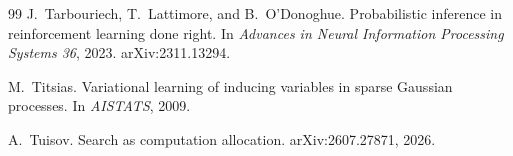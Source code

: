 \documentclass[11pt]{article}
\begin{document}
\begin{thebibliography}{99}
 J.~Tarbouriech, T.~Lattimore, and
B.~O'Donoghue. Probabilistic inference in reinforcement learning done
right. In \emph{Advances in Neural Information Processing Systems
36}, 2023. arXiv:2311.13294.

 M.~Titsias. Variational
learning of inducing variables in sparse Gaussian processes. In
\emph{AISTATS}, 2009.

 A.~Tuisov. Search as computation
allocation. arXiv:2607.27871, 2026.

\end{thebibliography}
\end{document}
